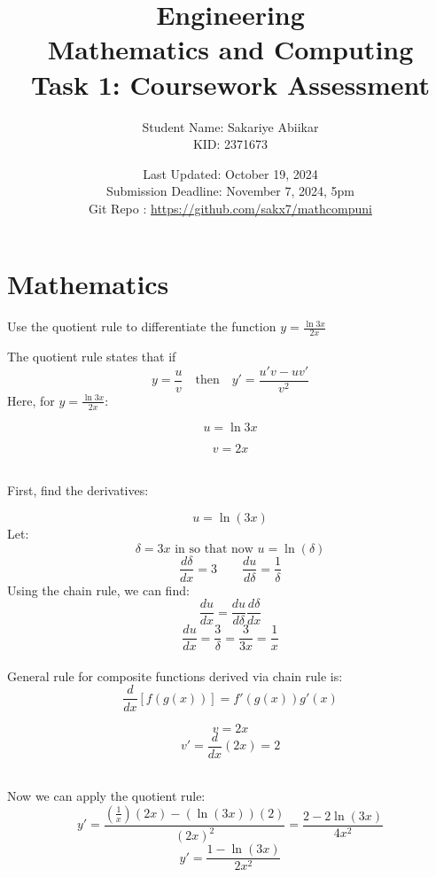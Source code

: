 \documentclass[a4paper, 12pt]{report}
\title{\vspace{3em} \Huge \textbf{Engineering\\ Mathematics and Computing}\\ \vspace{1em} \Large Task 1: Coursework Assessment}
\author{Student Name: Sakariye Abiikar\\ KID: 2371673}
\date{Last Updated: October 19, 2024\\ Submission Deadline: November 7, 2024, 5pm \\[1em] Git Repo : \color{blue}\url{https://github.com/sakx7/mathcompuni}}
\def\ni{blue!20!white}
\begin{document}
    
    \maketitle
    \thispagestyle{empty}
    
    \newpage
    \thispagestyle{empty}

    \chapter{Mathematics}
    
    \newpage\centering\restoregeometry
    
    \setcounter{page}{1}

    \begin{tcolorbox}[title={\color{black}{\section{Q1}}}, colback=white, colframe=\ni, boxrule=1mm, width=1\textwidth]
        Use the quotient rule to differentiate the function \( y=\frac{\ln 3 x}{2 x} \)
    \end{tcolorbox}
    
    The quotient rule states that if
    \[y = \frac{u}{v} \quad \text{then} \quad y' = \frac{u'v - uv'}{v^2}\]
    Here, for \(y=\frac{\ln 3 x}{2 x}\): \\[5pt]
    \begin{minipage}{0.4\textwidth}
        \[u = \ln 3x\] 
    \end{minipage}\hspace{-8em}
    \begin{minipage}{0.4\textwidth}
        \[v = 2x \]
    \end{minipage}\\[20pt]
    First, find the derivatives:\\[10pt]
    \begin{minipage}{0.43\textwidth}\centering
    \[u = \ln(3x)\]
    Let:
    \[\delta = 3x \text{ in so that now } u = \ln(\delta)\]
    \[\frac{d\delta}{dx} = 3 \qquad \frac{du}{d\delta} = \frac{1}{\delta} \]
    Using the chain rule, we can find:
    \[\frac{du}{dx} = \frac{du}{d\delta} \frac{d\delta}{dx}\]
    \[\frac{du}{dx} = \frac{3}{\delta} = \frac{3}{3x}= \frac{1}{x}\]\\[1em]
    General rule for composite functions derived via chain rule is:\\[-20pt]
    \[\frac{d}{dx}\left[f(g(x))\right] = f'(g(x)) g'(x)\]
    \end{minipage}\hspace{1em}\vrule\hspace{-2.5em}
    \begin{minipage}{0.4\textwidth}
        \[v = 2x\]
        \[v' = \frac{d}{dx}(2x) = 2\]
    \end{minipage}\\[30pt]
    Now we can apply the quotient rule:
    \[y' = \frac{\left(\frac{1}{x}\right)(2x) - (\ln(3x))(2)}{(2x)^2} = \frac{2 - 2\ln (3x)}{4x^2}\]
    \[\boxed{y' = \frac{1 - \ln(3x)}{2x^2}}\]
    
\end{document}
